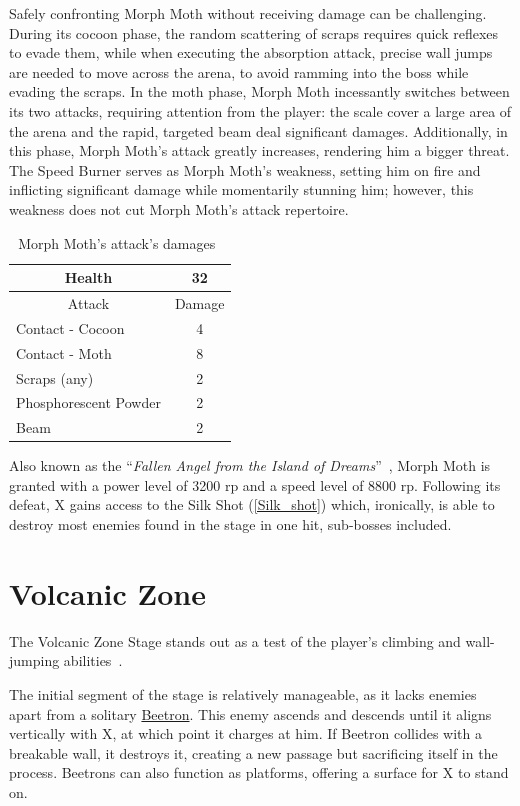 Safely confronting Morph Moth without receiving damage can be challenging. During its cocoon phase, the random scattering of scraps requires quick reflexes to evade them, while when executing the absorption attack, precise wall jumps are needed to move across the arena, to avoid ramming into the boss while evading the scraps. In the moth phase, Morph Moth incessantly switches between its two attacks, requiring attention from the player: the scale cover a large area of the arena and the rapid, targeted beam deal significant damages. Additionally, in this phase, Morph Moth's attack greatly increases, rendering him a bigger threat. The Speed Burner serves as Morph Moth's weakness, setting him on fire and inflicting significant damage while momentarily stunning him; however, this weakness does not cut Morph Moth's attack repertoire.
\begin{table}[htp]
	\centering
	\begin{tabular}[h]{l c}
		\toprule
		\multicolumn{1}{c}{Health}  & 32 \\
		\midrule
		\multicolumn{1}{c}{Attack} & \multicolumn{1}{c}{Damage}\\
		Contact - Cocoon & 4 \\
		Contact - Moth& 8\\
		Scraps (any) & 2\\
		Phosphorescent Powder& 2\\
		Beam & 2\\
		\bottomrule
	\end{tabular}
	\caption{Morph Moth's attack's damages~\cite{wiki:Morph_moth,book:Compendium}}
\end{table}
Also known as the ``\textit{Fallen Angel from the Island of Dreams}''~\cite{book:MMX_Complete_art}, Morph Moth is granted with a power level of 3200 rp and a speed level of 8800 rp. Following its defeat, X gains access to the Silk Shot (\ref{Silk_shot}) which, ironically, is able to destroy most enemies found in the stage in one hit, sub-bosses included.


\section{Volcanic Zone}
The Volcanic Zone Stage stands out as a test of the player's climbing and wall-jumping abilities~\cite{stratwiki:Volcanic_zone}.

The initial segment of the stage is relatively manageable, as it lacks enemies apart from a solitary \hyperlink{enem:Beetron}{Beetron}. This enemy ascends and descends until it aligns vertically with X, at which point it charges at him. If Beetron collides with a breakable wall, it destroys it, creating a new passage but sacrificing itself in the process. Beetrons can also function as platforms, offering a surface for X to stand on.

